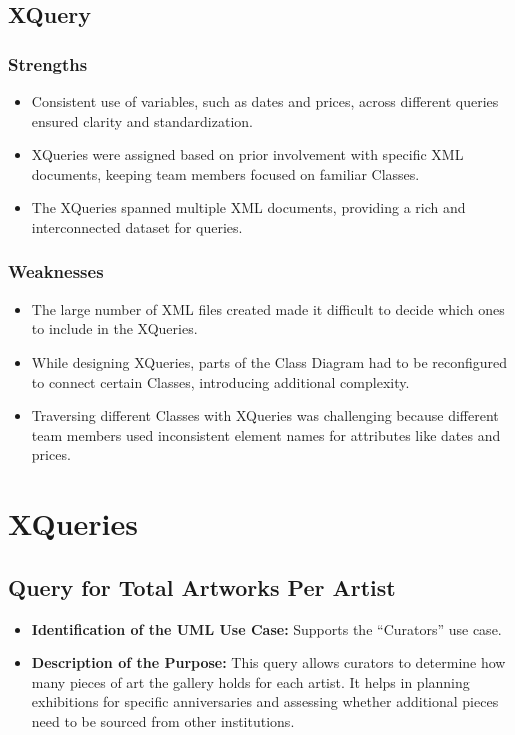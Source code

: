 \documentclass{article} %
\begin{document}
\subsection{XQuery}

\subsubsection{Strengths}
\begin{itemize}
    \item Consistent use of variables, such as dates and prices, across different queries ensured clarity and standardization.
    \item XQueries were assigned based on prior involvement with specific XML documents, keeping team members focused on familiar Classes.
    \item The XQueries spanned multiple XML documents, providing a rich and interconnected dataset for queries.
\end{itemize}

\subsubsection{Weaknesses}
\begin{itemize}
    \item The large number of XML files created made it difficult to decide which ones to include in the XQueries.
    \item While designing XQueries, parts of the Class Diagram had to be reconfigured to connect certain Classes, introducing additional complexity.
    \item Traversing different Classes with XQueries was challenging because different team members used inconsistent element names for attributes like dates and prices.
\end{itemize}

\newpage
\section{XQueries}
\subsection{Query for Total Artworks Per Artist}
\begin{itemize}
    \item \textbf{Identification of the UML Use Case:} Supports the ``Curators'' use case.
    \item \textbf{Description of the Purpose:} This query allows curators to determine how many pieces of art the gallery holds for each artist. It helps in planning exhibitions for specific anniversaries and assessing whether additional pieces need to be sourced from other institutions.
\end{itemize}
\end{document}
